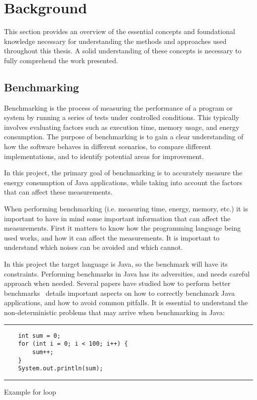 
\chapter{Background}\label{chapter:background}

This section provides an overview of the essential concepts and foundational knowledge necessary for understanding the methods and approaches used throughout this thesis. A solid understanding of these concepts is necessary to fully comprehend the work presented.


\section{Benchmarking} \label{sec:background_benchmarking}

Benchmarking is the process of measuring the performance of a program or system by running a series of tests under controlled conditions. This typically involves evaluating factors such as execution time, memory usage, and energy consumption. The purpose of benchmarking is to gain a clear understanding of how the software behaves in different scenarios, to compare different implementations, and to identify potential areas for improvement.

In this project, the primary goal of benchmarking is to accurately measure the energy consumption of Java applications, while taking into account the factors that can affect these measurements.

When performing benchmarking (i.e. measuring time, energy, memory, etc.) it is important to have in mind some important information that can affect the measurements. First it matters to know how the programming language being used works, and how it can affect the measurements. It is important to understand which noises can be avoided and which cannot.

In this project the target language is Java, so the benchmark will have its constraints. Performing benchmarks in Java has its adversities, and needs careful approach when needed. Several papers have studied how to perform better benchmarks~\cite{10.1145/1297027.1297033,10.1145/1167515.1167488} details important aspects on how to correctly benchmark Java applications, and how to avoid common pitfalls.
It is essential to understand the non-deterministic problems that may arrive when benchmarking in Java:

\begin{listing}[H]
\noindent\rule{\linewidth}{0.4pt}
\begin{verbatim}
    int sum = 0;
    for (int i = 0; i < 100; i++) {
        sum++;
    }
    System.out.println(sum);
\end{verbatim}
\noindent\rule{\linewidth}{0.4pt}
\caption{Example for loop}            
\label{lst:for_loop_example}
\end{listing}


